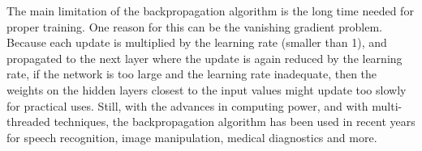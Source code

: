 \documentclass[12pt,oneside]{CUNY_CS_PhD}
\begin{document}
The main limitation of the backpropagation algorithm is the long time needed for proper training. One reason for this can be the vanishing gradient problem.
Because each update is multiplied by the learning rate (smaller than 1), and propagated to the next layer where the update is again reduced by the learning rate, if the network is too large and the learning rate inadequate, then the weights on the hidden layers closest to the input values might update too slowly for practical uses. 
Still, with the advances in computing power, and with multi-threaded techniques, the backpropagation algorithm has been used in recent years for speech recognition, image manipulation, medical diagnostics and more.
\end{document}
